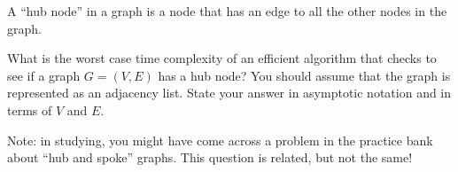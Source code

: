 \begin{prob}
    A ``hub node'' in a graph is a node that has an edge to all the other nodes
    in the graph.

    What is the worst case time complexity of an efficient algorithm that
    checks to see if a graph $G = (V,E)$ has a hub node? You should assume that
    the graph is represented as an adjacency list. State your answer in asymptotic
    notation and in terms of $V$ and $E$.

    Note: in studying, you might have come across a problem in the practice
    bank about ``hub and spoke'' graphs. This question is related, but not the
    same!

\end{prob}
